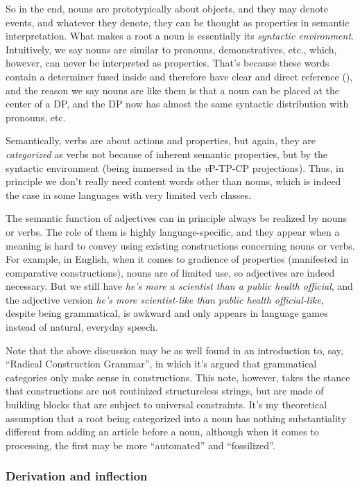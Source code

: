 \documentclass[UTF8, a4paper, oneside, scheme=plain, 12pt]{ctexbook}
\newcommand{\form}[1]{\emph{#1}}
\newcommand{\vP}{\textit{v}P}
\begin{document}
{So in the end,
nouns are prototypically about objects,
and they may denote events, 
and whatever they denote, they can be thought as properties in semantic interpretation.
What makes a root a noun 
is essentially its \emph{syntactic environment}.
Intuitively, we say nouns are similar to pronouns, demonstratives, etc., 
which, however, can never be interpreted as properties.
That's because these words contain a determiner fused inside 
and therefore have clear and direct reference (),
and the reason we say nouns are like them 
is that a noun can be placed at the center of a DP, 
and the DP now has almost the same syntactic distribution with pronouns, etc. 

Semantically, verbs are about actions and properties,
but again, they are \emph{categorized} as verbs 
not because of inherent semantic properties, 
but by the syntactic environment
(being immersed in the \vP-TP-CP projections).
Thus, in principle we don't really need content words other than nouns,
which is indeed the case in some languages
with very limited verb classes.

The semantic function of adjectives can in principle always be realized by nouns or verbs.
The role of them is highly language-specific,
and they appear when a meaning is hard to convey using existing constructions concerning nouns or verbs.
For example, in English, when it comes to gradience of properties
(manifested in comparative constructions),
nouns are of limited use,
so adjectives are indeed necessary.
But we still have \form{he's more a scientist than a public health official},
and the adjective version \form{he's more scientist-like than public health official-like},
despite being grammatical, is awkward
and only appears in language games instead of natural, everyday speech.

Note that the above discussion may be as well found in an introduction to, say, 
``Radical Construction Grammar'',
in which it's argued that grammatical categories only make sense 
in constructions.
This note, however, takes the stance that 
constructions are not routinized structureless strings,
but are made of building blocks that are subject to universal constraints.
It's my theoretical assumption that a root being categorized into a noun 
has nothing substantiality different from adding an article before a noun,
although when it comes to processing,
the first may be more ``automated'' and ``fossilized''.

\subsubsection{Derivation and inflection}

}
\end{document}
